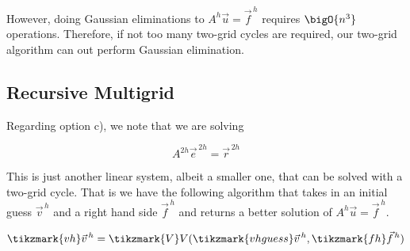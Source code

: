 \vspace{2em}

However, doing Gaussian eliminations to $A^h\vec{u} = \vec{f}^{\,h}$ requires
$\bigO{n^3}$ operations. Therefore, if not too many two-grid cycles are required,
our two-grid algorithm can out perform Gaussian elimination.

\pagebreak

\subsection{Recursive Multigrid}
Regarding option c), we note that we are solving

\begin{equation*}
A^{2h}\vec{e}^{\,2h} = \vec{r}^{\,2h}
\end{equation*}

This is just another linear system, albeit a smaller one, that can be solved
with a two-grid cycle. That is we have the following algorithm that takes in an
initial guess $\vec{v}^{\,h}$ and a right hand side $\vec{f}^{\,h}$ and returns
a better solution of $A^h\vec{u} = \vec{f}^{\,h}$.

\vspace{2em}
\begin{equation*}
\tikzmark{vh}\vec{v}^{\,h} = \tikzmark{V}V(\tikzmark{vhguess}\vec{v}^{\,h}, \tikzmark{fh}\vec{f}^{\,h})
\end{equation*}

{
\color{red}

}
\vspace{2em}

